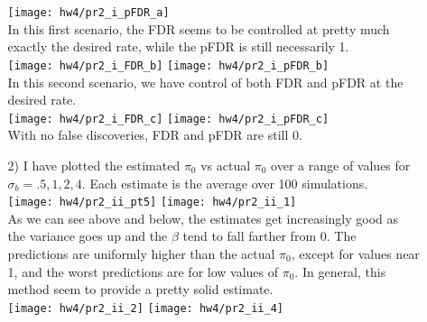 \documentclass[11pt]{article}
\theoremstyle{definition}
\begin{document}
\begin{itemize}
\begin{itemize}
                \texttt{[image: hw4/pr2\_i\_pFDR\_a]} \\
                In this first scenario, the FDR seems to be controlled at pretty much exactly the desired rate, while the pFDR is still necessarily 1.\\
                \texttt{[image: hw4/pr2\_i\_FDR\_b]}
                \texttt{[image: hw4/pr2\_i\_pFDR\_b]} \\
                In this second scenario, we have control of both FDR and pFDR at the desired rate.\\
                \texttt{[image: hw4/pr2\_i\_FDR\_c]}
                \texttt{[image: hw4/pr2\_i\_pFDR\_c]} \\
                With no false discoveries, FDR and pFDR are still 0.
            \item[2)]
                I have plotted the estimated $\pi_0$ vs actual $\pi_0$ over a range of values for $\sigma_b=.5,1,2,4$. Each estimate is the average over 100 simulations. \\
                \texttt{[image: hw4/pr2\_ii\_pt5]}
                \texttt{[image: hw4/pr2\_ii\_1]}\\
                As we can see above and below, the estimates get increasingly good as the variance goes up and the $\beta$ tend to fall farther from $0$. The predictions are uniformly higher than the actual $\pi_0$, except for values near 1, and the worst predictions are for low values of $\pi_0$. In general, this method seem to provide a pretty solid estimate. \\
                \texttt{[image: hw4/pr2\_ii\_2]}
                \texttt{[image: hw4/pr2\_ii\_4]}\\

        \end{itemize}
\end{itemize}
\end{document}
